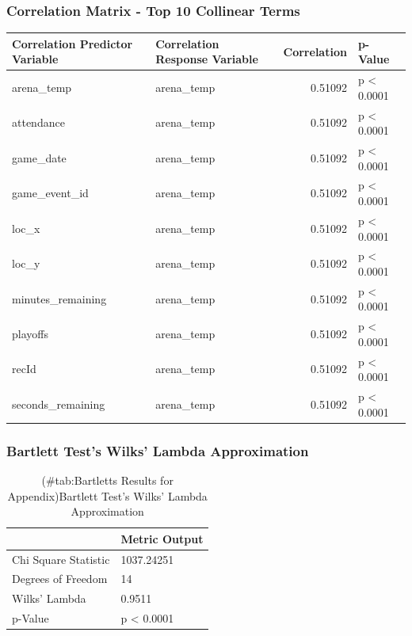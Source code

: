 \documentclass[american,]{article}
\begin{document}
\hypertarget{correlation-matrix---top-10-collinear-terms}{%
\subsubsection{Correlation Matrix - Top 10 Collinear Terms}\label{correlation-matrix---top-10-collinear-terms}}

\begin{table}[!h]
\centering
\begin{tabular}{llrl}
\toprule
Correlation Predictor Variable & Correlation Response Variable & Correlation & p-Value\\
\midrule
arena\_temp & arena\_temp & 0.51092 & p < 0.0001\\
attendance & arena\_temp & 0.51092 & p < 0.0001\\
game\_date & arena\_temp & 0.51092 & p < 0.0001\\
game\_event\_id & arena\_temp & 0.51092 & p < 0.0001\\
loc\_x & arena\_temp & 0.51092 & p < 0.0001\\
\addlinespace
loc\_y & arena\_temp & 0.51092 & p < 0.0001\\
minutes\_remaining & arena\_temp & 0.51092 & p < 0.0001\\
playoffs & arena\_temp & 0.51092 & p < 0.0001\\
recId & arena\_temp & 0.51092 & p < 0.0001\\
seconds\_remaining & arena\_temp & 0.51092 & p < 0.0001\\
\bottomrule
\end{tabular}
\end{table}

\hypertarget{bartlett-tests-wilks-lambda-approximation}{%
\subsubsection{Bartlett Test's Wilks' Lambda Approximation}\label{bartlett-tests-wilks-lambda-approximation}}

\begin{table}[t]

\caption{(\#tab:Bartletts Results for Appendix)Bartlett Test's Wilks' Lambda Approximation}
\centering
\begin{tabular}{ll}
\toprule
  & Metric Output\\
\midrule
Chi Square Statistic & 1037.24251\\
Degrees of Freedom & 14\\
Wilks' Lambda & 0.9511\\
p-Value & p < 0.0001\\
\bottomrule
\end{tabular}
\end{table}
\end{document}

